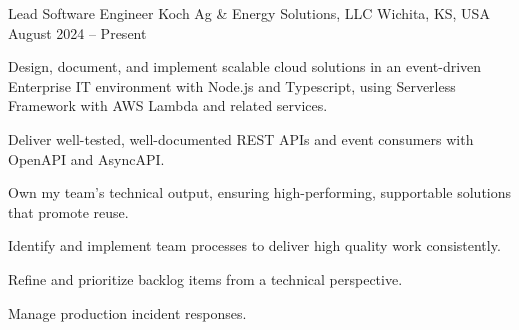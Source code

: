 
\begin{cventries}

	\cventry
	{Lead Software Engineer} %
	{Koch Ag \& Energy Solutions, LLC} %
	{Wichita, KS, USA} %
	{August 2024 -- Present} %
	{
		\begin{cvitems}
			\item Design, document, and implement scalable cloud solutions in an
			event-driven Enterprise IT environment with Node.js and Typescript,
			using Serverless Framework with AWS Lambda and related services.
			\item Deliver well-tested, well-documented REST APIs and event consumers
			with OpenAPI and AsyncAPI.
			\item Own my team's technical output, ensuring high-performing,
			supportable solutions that promote reuse.
			\item Identify and implement team processes to deliver high quality work
			consistently.
			\item Refine and prioritize backlog items from a technical perspective.
			\item Manage production incident responses.
		\end{cvitems}
	}


\end{cventries}
